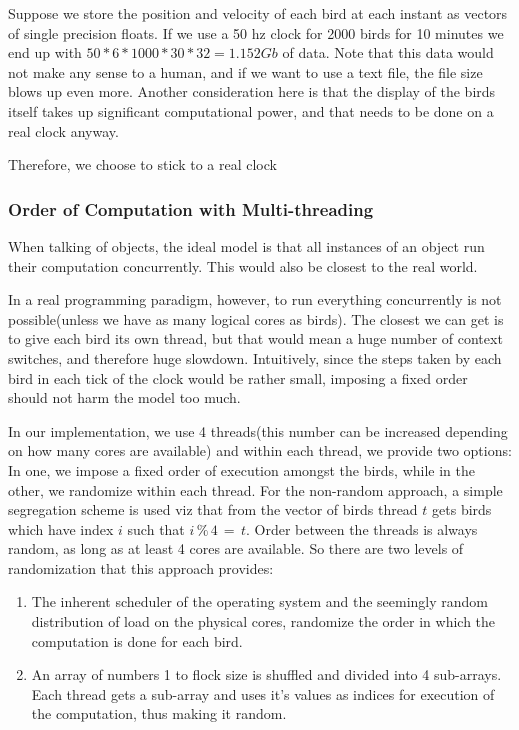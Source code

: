 \documentclass{article}
\begin{document}
Suppose we store the position and velocity of each bird at each instant as vectors of single precision floats. If we use a 50 hz clock for 2000 birds for 10 minutes we end up with $50*6*1000*30*32=1.152 Gb$ of data. Note that this data would not make any sense to a human, and if we want to use a text file, the file size blows up even more. Another consideration here is that the display of the birds itself takes up significant computational power, and that needs to be done on a real clock anyway. 

Therefore, we choose to stick to a real clock
\subsubsection{Order of Computation with Multi-threading}
When talking of objects, the ideal model is that all instances of an object run their computation concurrently. This would also be closest to the real world. 

In a real programming paradigm, however, to run everything concurrently is not possible(unless we have as many logical cores as birds). The closest we can get is to give each bird its own thread, but that would mean a huge number of context switches, and therefore huge slowdown. Intuitively, since the steps taken by each bird in each tick of the clock would be rather small, imposing a fixed order should not harm the model too much. 

In our implementation, we use 4 threads(this number can be increased depending on how many cores are available) and within each thread, we provide two options: In one, we impose a fixed order of execution amongst the birds, while in the other, we randomize within each thread. For the non-random approach, a simple segregation scheme is used viz that from the vector of birds thread $t$ gets birds which have index $i$ such that $i\,\%\,4\,=\,t$. Order between the threads is always random, as long as at least 4 cores are available. So there are two levels of randomization that this approach provides:
\begin{enumerate}
\item The inherent scheduler of the operating system and the seemingly random distribution of load on the physical cores, randomize the order in which the computation is done for each bird.
\item An array of numbers 1 to flock size is shuffled and divided into 4 sub-arrays. Each thread gets a sub-array and uses it's values as indices for execution of the computation, thus making it random.
\end{enumerate}
\end{document}
